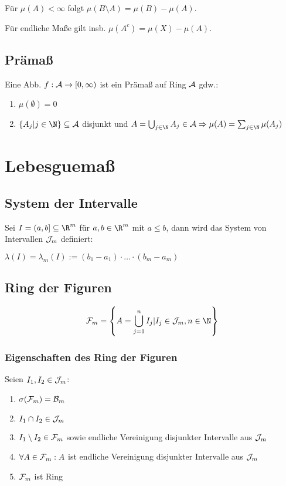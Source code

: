 Für $\mu(A) < \infty$ folgt $\mu(B\setminus A) = \mu(B) - \mu(A)$.

Für endliche Maße gilt insb. $\mu(A^c) = \mu(X) - \mu(A)$.

\subsection*{Prämaß}

Eine Abb. $f : \mathcal{A} \to [0, \infty)$ ist ein Prämaß auf Ring $\mathcal{A}$ gdw.:

\begin{enumerate}[label=(\alph*)]
	\item $\mu(\emptyset) = 0$
	\item $\{A_j | j \in \N\} \subseteq \A$ disjunkt und $A = \bigcup_{j\in \N} A_j \in \A \Rightarrow \mu(A) = \sum_{j\in \N} \mu(A_j)$
\end{enumerate}

\section*{Lebesguemaß}

\subsection*{System der Intervalle}

Sei $I = (a, b] \subseteq \R^m$ für $a, b \in \R^m$ mit $a \leq b$, dann wird das System von Intervallen $\mathcal{J}_m$ definiert:

$\lambda(I) = \lambda_m(I) := (b_1 - a_1) \cdot \hdots \cdot (b_m - a_m)$

\subsection*{Ring der Figuren}

$$\F_m = \left\{ A = \bigcup_{j=1}^n I_j | I_j \in \J_m, n \in \N \right\}$$

\subsubsection*{Eigenschaften des Ring der Figuren}

Seien $I_1, I_2 \in \mathcal{J}_m$:

\begin{enumerate}[label=(\alph*)]
	\item $\sigma(\mathcal{F}_m) = \mathcal{B}_m$
	\item $I_1 \cap I_2 \in \mathcal{J}_m$
	\item $I_1 \setminus I_2 \in \mathcal{F}_m$ sowie endliche Vereinigung disjunkter Intervalle aus $\mathcal{J}_m$
	\item $\forall A \in \mathcal{F}_m: A$ ist endliche Vereinigung disjunkter Intervalle aus $\mathcal{J}_m$
	\item $\mathcal{F}_m$ ist Ring
\end{enumerate}

